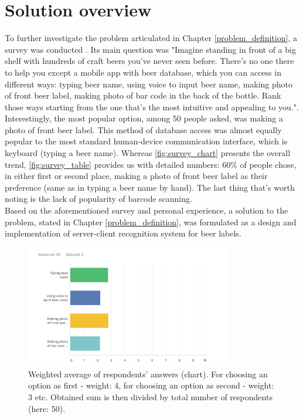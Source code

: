 \documentclass[11pt, a4paper]{article}
\begin{document}
\section{Solution overview} \label{solution_overview}
To further investigate the problem articulated in Chapter \ref{problem_definition}, a survey was conducted \cite{survey}. Its main question was "Imagine standing in front of a big shelf with hundreds of craft beers you've never seen before. There's no one there to help you except a mobile app with beer database, which you can access in different ways: typing beer name, using voice to input beer name, making photo of front beer label, making photo of bar code in the back of the bottle. Rank those ways starting from the one that's the most intuitive and appealing to you.". Interestingly, the most popular option, among 50 people asked, was making a photo of front beer label. This method of database access was almost equally popular to the most standard human-device communication interface, which is keyboard (typing a beer name). Whereas \autoref{fig:survey_chart} presents the overall trend, \autoref{fig:survey_table} provides us with detailed numbers: 60\% of people chose, in either first or second place, making a photo of front beer label as their preference (same as in typing a beer name by hand). The last thing that's worth noting is the lack of popularity of barcode scanning.\\

Based on the aforementioned survey and personal experience, a solution to the problem, stated in Chapter \ref{problem_definition}, was formulated as a design and implementation of server-client recognition system for beer labels.

\begin{figure}[h]
\includegraphics[width=0.8\textwidth]{survey_chart}
\centering
\caption[Średnia ważona respondentów (wykres)]{Weighted average of respondents' answers (chart). For choosing an option as first - weight: 4, for choosing an option as second - weight: 3 etc. Obtained sum is then divided by total number of respondents (here: 50).}
\label{fig:survey_chart}
\end{figure}
\end{document}
